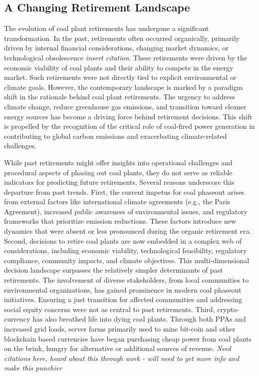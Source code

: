 
\subsection{A Changing Retirement Landscape}

The evolution of coal plant retirements has undergone a significant transformation. 
In the past, retirements often occurred organically, primarily driven by internal financial considerations, 
changing market dynamics, or technological obsolescence \textit{insert citation}. 
These retirements were driven by the economic viability of coal plants and their ability to compete 
in the energy market. Such retirements were not directly tied to explicit environmental or climate goals. 
However, the contemporary landscape is marked by a paradigm shift in the rationale behind coal plant retirements. 
The urgency to address climate change, reduce greenhouse gas emissions, and transition toward cleaner energy 
sources has become a driving force behind retirement decisions. This shift is propelled by the recognition of 
the critical role of coal-fired power generation in contributing to global carbon emissions and exacerbating 
climate-related challenges.

While past retirements might offer insights into operational challenges and procedural aspects of phasing out 
coal plants, they do not serve as reliable indicators for predicting future retirements. Several reasons underscore 
this departure from past trends. First, the current impetus for coal phaseout arises from external factors like 
international climate agreements (e.g., the Paris Agreement), increased public awareness of environmental issues, 
and regulatory frameworks that prioritize emission reductions. These factors introduce new dynamics that were 
absent or less pronounced during the organic retirement era. Second, decisions to retire coal plants are now embedded 
in a complex web of considerations, including economic viability, technological feasibility, regulatory compliance, 
community impacts, and climate objectives. This multi-dimensional decision landscape surpasses the relatively simpler 
determinants of past retirements. The involvement of diverse stakeholders, from local communities to environmental 
organizations, has gained prominence in modern coal phaseout initiatives. Ensuring a just transition for affected 
communities and addressing social equity concerns were not as central to past retirements. Third, crypto-currency has 
also breathed life into dying coal plants. Through both PPAs and increased grid loads, server farms primarily used to 
mine bit-coin and other blockchain based currencies have began purchasing cheap power from coal plants on the brink, hungry 
for alternative or additional sources of revenue. \textit{Need citations here, heard about this through work - will need 
to get more info and make this punchier}

